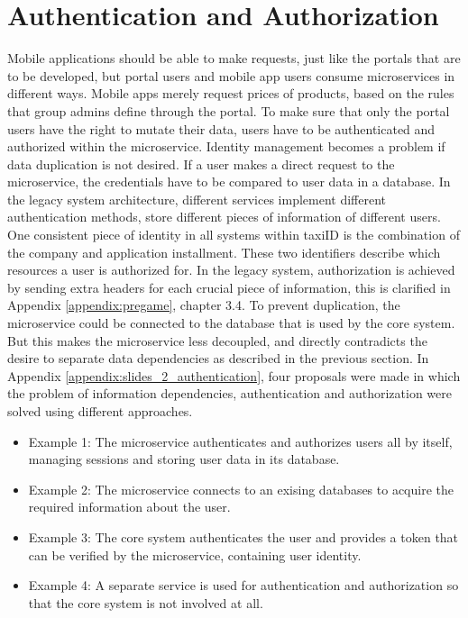 \section{Authentication and Authorization}
Mobile applications should be able to make requests, just like the portals that are to be developed, but portal users and mobile app users consume microservices in different ways. Mobile apps merely request prices of products, based on the rules that group admins define through the portal. To make sure that only the portal users have the right to mutate their data, users have to be authenticated and authorized within the microservice. Identity management becomes a problem if data duplication is not desired. If a user makes a direct request to the microservice, the credentials have to be compared to user data in a database. In the legacy system architecture, different services implement different authentication methods, store different pieces of information of different users. One consistent piece of identity in all systems within taxiID is the combination of the company and application installment. These two identifiers describe which resources a user is authorized for. In the legacy system, authorization is achieved by sending extra headers for each crucial piece of information, this is clarified in Appendix \ref{appendix:pregame}, chapter 3.4. To prevent duplication, the microservice could be connected to the database that is used by the core system. But this makes the microservice less decoupled, and directly contradicts the desire to separate data dependencies as described in the previous section. In Appendix \ref{appendix:slides_2_authentication}, four proposals were made in which the problem of information dependencies, authentication and authorization were solved using different approaches.

\begin{itemize}
	\item Example 1: The microservice authenticates and authorizes users all by itself, managing sessions and storing user data in its database.
	\item Example 2: The microservice connects to an exising databases to acquire the required information about the user.
	\item Example 3: The core system authenticates the user and provides a token that can be verified by the microservice, containing user identity.
	\item Example 4: A separate service is used for authentication and authorization so that the core system is not involved at all.
\end{itemize}

